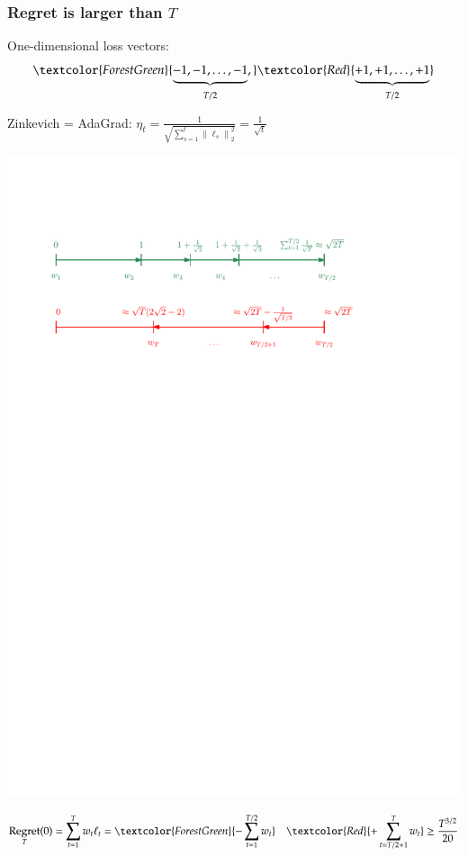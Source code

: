 \documentclass[usenames,dvipsnames]{beamer}
\DeclareMathOperator{\Regret}{Regret}
\newcommand{\norm}[1]{\left\|#1\right\|}
\begin{document}
\begin{frame}
\frametitle{Regret is larger than $T$}

One-dimensional loss vectors:
$$
\textcolor{ForestGreen}{\underbrace{-1, -1, \dots, -1}_{T/2},} \textcolor{Red}{\underbrace{+1, +1, \dots, +1}_{T/2}}
$$

Zinkevich = AdaGrad: \quad $\eta_t = \frac{1}{\sqrt{\sum_{s=1}^t \norm{\ell_s}_2^2}} = \frac{1}{\sqrt{t}}$

\vspace{0.3cm}

\begin{center}
\includegraphics[scale=0.5]{gd-lower-bound}
\end{center}
$$
\Regret_T(0) = \sum_{t=1}^T w_t \ell_t = \textcolor{ForestGreen}{-\sum_{t=1}^{T/2} w_t} \quad \textcolor{Red}{+ \sum_{t={T/2+1}}^T w_t} \ge \frac{T^{3/2}}{20}
$$
\end{frame}
\end{document}
